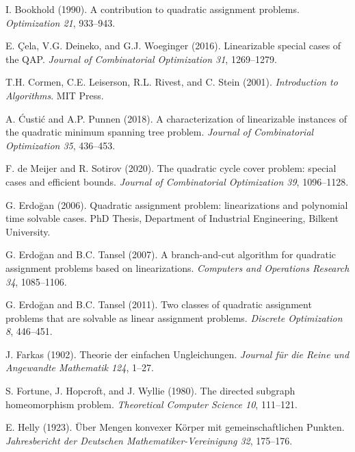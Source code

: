 \documentclass[11pt,fleqn]{article}
\begin{document}
\medskip
\begin{thebibliography}{18}

{\sc I. Bookhold} (1990).
A contribution to quadratic assignment problems.
\emph{Optimization 21}, 933--943.

{\sc E. \c{C}ela, V.G. Deineko, and G.J. Woeginger} (2016).
Linearizable special cases of the {QAP}.
\emph{Journal of Combinatorial Optimization 31}, 1269--1279.

{\sc T.H. Cormen, C.E. Leiserson, R.L. Rivest, and C. Stein} (2001).
\emph{Introduction to Algorithms}.
MIT Press.

{\sc A. {\'C}usti{\'c} and A.P. Punnen} (2018).
A characterization of linearizable instances of the quadratic minimum spanning tree problem.
\emph{Journal of Combinatorial Optimization 35}, 436--453.

{\sc F. de Meijer and R. Sotirov} (2020).
The quadratic cycle cover problem: special cases and efficient bounds.
\emph{Journal of Combinatorial Optimization 39}, 1096--1128.

{\sc G. Erdo\u{g}an} (2006).
Quadratic assignment problem: linearizations and polynomial time solvable cases.
PhD Thesis, Department of Industrial Engineering, Bilkent University.

{\sc G. Erdo\u{g}an and B.C. Tansel} (2007).
A branch-and-cut algorithm for quadratic assignment problems based on linearizations.
\emph{Computers and Operations Research 34}, 1085--1106.

{\sc G. Erdo\u{g}an and B.C. Tansel} (2011).
Two classes of quadratic assignment problems that are solvable as linear assignment problems.
\emph{Discrete Optimization 8}, 446--451.

{\sc J. Farkas} (1902).
Theorie der einfachen {U}ngleichungen.
\emph{Journal f\"ur die Reine und Angewandte Mathematik 124}, 1--27.

{\sc S. Fortune, J. Hopcroft, and J. Wyllie} (1980).
The directed subgraph homeomorphism problem.
\emph{Theoretical Computer Science 10}, 111--121.

{\sc E. Helly} (1923).
\"Uber {M}engen konvexer {K}\"orper mit gemeinschaftlichen {P}unkten.
\emph{Jahresbericht der {D}eutschen {M}athematiker-{V}ereinigung 32}, 175--176.


\end{thebibliography}
\end{document}
